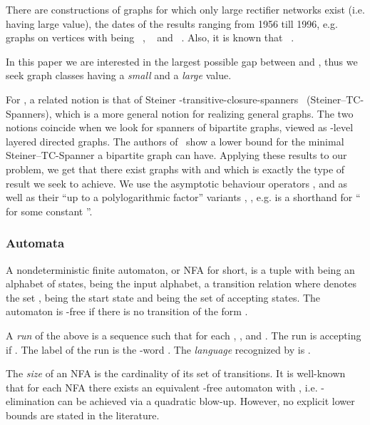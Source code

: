 \documentclass[submission]{llncs}
\begin{document}
  There are constructions of graphs for which only large rectifier networks exist (i.e. having large  value), the dates of the results ranging
  from 1956 till 1996, e.g. graphs  on  vertices with
   being ~\cite{Nechiporuk}, ~\cite{Mehlhorn,Pippenger:1976:SGA:321958.321962,Wegener}
  and ~\cite{kollar1996norm}. Also, it is known that ~\cite{Lupanov}.

  In this paper we are interested in the largest possible gap between  and , thus we seek graph classes having a
  \emph{small}  and a \emph{large}  value.

  For , a related notion is that of Steiner -transitive-closure\--spanners~\cite{BermanEtal} (Steiner--TC-Spanners),
  which is a more general notion for realizing general graphs. The two notions coincide when we look for
  spanners of bipartite graphs, viewed as -level layered directed graphs.
  The authors of~\cite{BermanEtal} show a lower bound for the minimal Steiner--TC-Spanner a bipartite graph can have.
  Applying these results to our problem, we get that there exist graphs with  and 
  which is exactly the type of result we seek to achieve.
We use the asymptotic behaviour operators ,  and  as well as their ``up to a polylogarithmic factor'' variants
  , , e.g.  is a shorthand for `` for some constant ''.
\subsubsection{Automata}
  A nondeterministic finite automaton, or NFA for short, is a tuple  with  being an alphabet of states,
   being the input alphabet,  a transition relation where
   denotes the set ,  being the start state and  being
  the set of accepting states. The automaton is -free if there is no transition of the form .

  A \emph{run} of the above  is a sequence  such that for each
  , , and . The run is accepting if . The label of the run is the -word
  . The \emph{language} recognized by  is .

  The \emph{size} of an NFA  is the cardinality  of its set  of transitions.
  It is well-known that for each NFA  there exists an equivalent -free automaton  with , i.e.
  -elimination can be achieved via a quadratic blow-up. However, no explicit lower bounds are stated in the literature.
\end{document}
